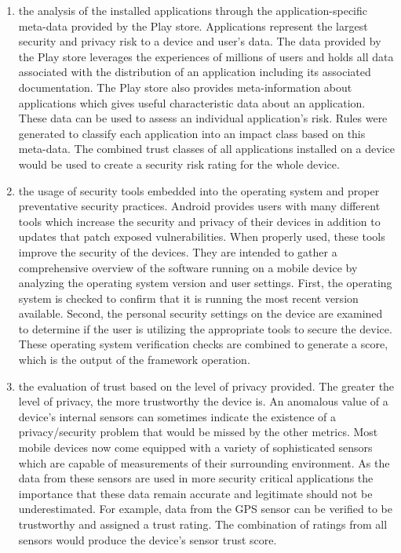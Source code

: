 \begin{enumerate}
\item the analysis of the installed applications through the application-specific meta-data provided by the Play store. Applications represent the largest security and privacy risk to a device and user's data. The data provided by the Play store leverages the experiences of millions of users and holds all data associated with the distribution of an application including its associated documentation. The Play store also provides meta-information about applications which gives useful characteristic data about an application. These data can be used to assess an individual application's risk. Rules were generated to classify each application into an impact class based on this meta-data. The combined trust classes of all applications installed on a device would be used to create a security risk rating for the whole device.

\item the usage of security tools embedded into the operating system and proper preventative security practices.
Android provides users with many different tools which increase the security and privacy of their devices in addition to updates 
that patch exposed vulnerabilities.  When properly used, these tools improve the security of the devices. They are 
intended to gather a 
comprehensive overview of the software running on a mobile device by analyzing the operating system version and user settings. 
First, the operating system is checked to confirm that it is running the most recent version available. Second, the personal 
security settings on the device are examined to determine if the user is utilizing the appropriate tools to secure the device. 
These operating system verification checks are combined to generate a score, which is the output of the framework operation.

\item the evaluation of trust  based on the level of privacy provided.  The greater the level of privacy, the more
trustworthy the device is.
An anomalous value of a device's internal sensors can sometimes indicate the existence of a privacy/security problem 
that would be missed by the other metrics. Most mobile devices now come equipped with a variety of sophisticated 
 sensors which are capable of  measurements of their surrounding environment. 
As the data from these sensors are used in more security critical applications the importance that these data remain accurate and legitimate should not be underestimated. For example, data from the GPS sensor can be verified to be trustworthy and assigned a trust rating. The combination of ratings from all sensors would produce the device's sensor trust score.
\end{enumerate}


